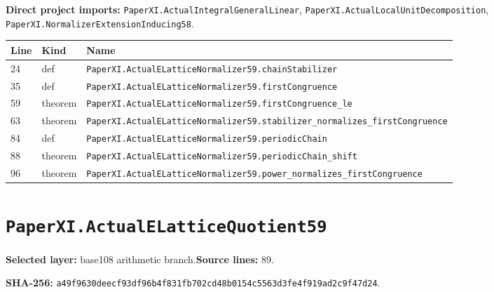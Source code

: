 \documentclass[10pt,oneside]{book}
\begin{document}

\textbf{Direct project imports:} \nolinkurl{PaperXI.ActualIntegralGeneralLinear}, \nolinkurl{PaperXI.ActualLocalUnitDecomposition}, \nolinkurl{PaperXI.NormalizerExtensionInducing58}.

\begin{longtable}{@{}p{}p{}p{}@{}}\toprule Line&Kind&Name\\\midrule\endhead

24&def&\nolinkurl{PaperXI.ActualELatticeNormalizer59.chainStabilizer}\\

35&def&\nolinkurl{PaperXI.ActualELatticeNormalizer59.firstCongruence}\\

59&theorem&\nolinkurl{PaperXI.ActualELatticeNormalizer59.firstCongruence_le}\\

63&theorem&\nolinkurl{PaperXI.ActualELatticeNormalizer59.stabilizer_normalizes_firstCongruence}\\

84&def&\nolinkurl{PaperXI.ActualELatticeNormalizer59.periodicChain}\\

88&theorem&\nolinkurl{PaperXI.ActualELatticeNormalizer59.periodicChain_shift}\\

96&theorem&\nolinkurl{PaperXI.ActualELatticeNormalizer59.power_normalizes_firstCongruence}\\

\bottomrule\end{longtable}

\section{\texorpdfstring{\nolinkurl{PaperXI.ActualELatticeQuotient59}}{PaperXI.ActualELatticeQuotient59}}\label{module:PaperXI.ActualELatticeQuotient59}

\textbf{Selected layer:} base108 arithmetic branch.\quad\textbf{Source lines:} 89.\par\textbf{SHA-256:} {\scriptsize\nolinkurl{a49f9630deecf93df96b4f831fb702cd48b0154c5563d3fe4f919ad2c9f47d24}}.

\end{document}
